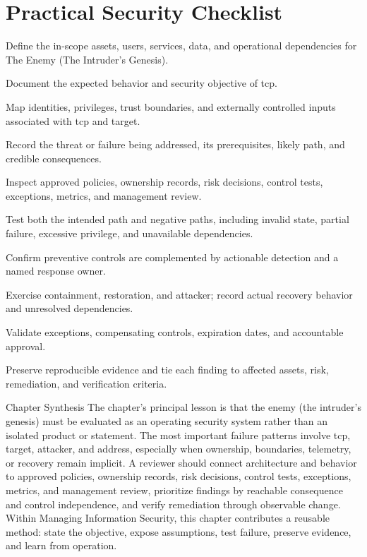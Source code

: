 \documentclass[11pt,letterpaper]{article}
\begin{document}
\section*{Practical Security Checklist}
\begin{CornellChecklist}
\item Define the in-scope assets, users, services, data, and operational dependencies for The Enemy (The Intruder's Genesis).
\item Document the expected behavior and security objective of tcp.
\item Map identities, privileges, trust boundaries, and externally controlled inputs associated with tcp and target.
\item Record the threat or failure being addressed, its prerequisites, likely path, and credible consequences.
\item Inspect approved policies, ownership records, risk decisions, control tests, exceptions, metrics, and management review.
\item Test both the intended path and negative paths, including invalid state, partial failure, excessive privilege, and unavailable dependencies.
\item Confirm preventive controls are complemented by actionable detection and a named response owner.
\item Exercise containment, restoration, and attacker; record actual recovery behavior and unresolved dependencies.
\item Validate exceptions, compensating controls, expiration dates, and accountable approval.
\item Preserve reproducible evidence and tie each finding to affected assets, risk, remediation, and verification criteria.
\end{CornellChecklist}
\begin{CornellSummaryBox}{Chapter Synthesis}
The chapter's principal lesson is that the enemy (the intruder's genesis) must be evaluated as an operating security system rather than an isolated product or statement. The most important failure patterns involve tcp, target, attacker, and address, especially when ownership, boundaries, telemetry, or recovery remain implicit. A reviewer should connect architecture and behavior to approved policies, ownership records, risk decisions, control tests, exceptions, metrics, and management review, prioritize findings by reachable consequence and control independence, and verify remediation through observable change. Within Managing Information Security, this chapter contributes a reusable method: state the objective, expose assumptions, test failure, preserve evidence, and learn from operation.
\end{CornellSummaryBox}
\end{document}
